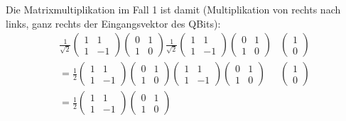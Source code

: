 Die Matrixmultiplikation im Fall 1 ist damit (Multiplikation von rechts nach links, ganz rechts der Eingangsvektor des QBits):
\begin{align}
    \frac{1}{\sqrt{2}}
    \begin{pmatrix}
        1 & 1 \\
        1 & -1
    \end{pmatrix}
    \begin{pmatrix}
        0 & 1 \\
        1 & 0
    \end{pmatrix} 
    \frac{1}{\sqrt{2}}
    \begin{pmatrix}
        1 & 1 \\
        1 & -1
    \end{pmatrix}
    \begin{pmatrix}
        0 & 1 \\
        1 & 0
    \end{pmatrix} 
    &\begin{pmatrix}
        1 \\
        0
    \end{pmatrix} \\
    =
    \frac{1}{2}
    \begin{pmatrix}
        1 & 1 \\
        1 & -1
    \end{pmatrix}
    \begin{pmatrix}
        0 & 1 \\
        1 & 0
    \end{pmatrix} 
    \begin{pmatrix}
        1 & 1 \\
        1 & -1
    \end{pmatrix}
    \begin{pmatrix}
        0 & 1 \\
        1 & 0
    \end{pmatrix} 
    &\begin{pmatrix}
        1 \\
        0
    \end{pmatrix} \\
    =
    \frac{1}{2}
    \begin{pmatrix}
        1 & 1 \\
        1 & -1
    \end{pmatrix}
    \begin{pmatrix}
        0 & 1 \\
        1 & 0
    \end{pmatrix} 

\end{align}
